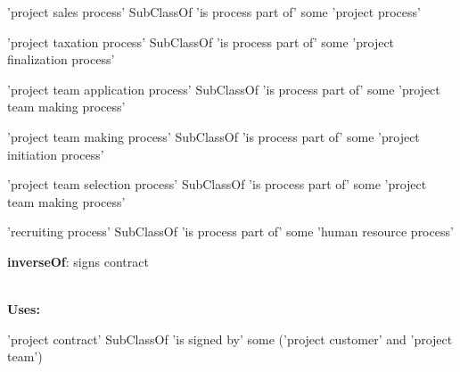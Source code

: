 \documentclass[a4paper, DIV=13, BCOR=0cm]{scrbook}
\begin{document}
\begin{mdframed}[style=onto, frametitle={is process part of}]
{\begin{compactitem}
			\item 'project sales process' SubClassOf 'is process part of' some 'project process'
			\item 'project taxation process' SubClassOf 'is process part of' some 'project finalization process'
			\item 'project team application process' SubClassOf 'is process part of' some 'project team making process'
			\item 'project team making process' SubClassOf 'is process part of' some 'project initiation process'
			\item 'project team selection process' SubClassOf 'is process part of' some 'project team making process'
			\item 'recruiting process' SubClassOf 'is process part of' some 'human resource process'
		\end{compactitem}
	} %
\end{mdframed}

\begin{mdframed}[style=onto, frametitle={is signed by}]
	{%
		\begin{compactitem}
			\item \textbf{inverseOf}: signs contract
		\end{compactitem}
		\hrulefill\\
		\textbf{Uses:}
		\begin{compactitem}
			\item 'project contract' SubClassOf 'is signed by' some 
			('project customer' and 'project team')
		\end{compactitem}
	} %
\end{mdframed}
\end{document}
